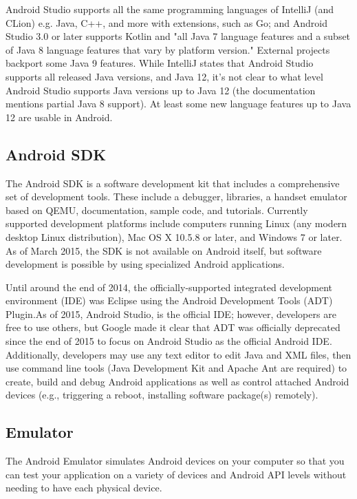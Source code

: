 Android Studio supports all the same programming languages of IntelliJ (and CLion) e.g. Java, C++, and more with extensions, such as Go; and Android Studio 3.0 or later supports Kotlin and "all Java 7 language features and a subset of Java 8 language features that vary by platform version." External projects backport some Java 9 features. While IntelliJ states that Android Studio supports all released Java versions, and Java 12, it's not clear to what level Android Studio supports Java versions up to Java 12 (the documentation mentions partial Java 8 support). At least some new language features up to Java 12 are usable in Android.

\subsection{Android SDK}

The Android SDK is a software development kit that includes a comprehensive set of development tools. These include a debugger, libraries, a handset emulator based on QEMU, documentation, sample code, and tutorials. Currently supported development platforms include computers running Linux (any modern desktop Linux distribution), Mac OS X 10.5.8 or later, and Windows 7 or later. As of March 2015, the SDK is not available on Android itself, but software development is possible by using specialized Android applications.

Until around the end of 2014, the officially-supported integrated development environment (IDE) was Eclipse using the Android Development Tools (ADT) Plugin.As of 2015, Android Studio, is the official IDE; however, developers are free to use others, but Google made it clear that ADT was officially deprecated since the end of 2015 to focus on Android Studio as the official Android IDE. Additionally, developers may use any text editor to edit Java and XML files, then use command line tools (Java Development Kit and Apache Ant are required) to create, build and debug Android applications as well as control attached Android devices (e.g., triggering a reboot, installing software package(s) remotely).

\subsection{Emulator}

The Android Emulator simulates Android devices on your computer so that you can test your application on a variety of devices and Android API levels without needing to have each physical device.

